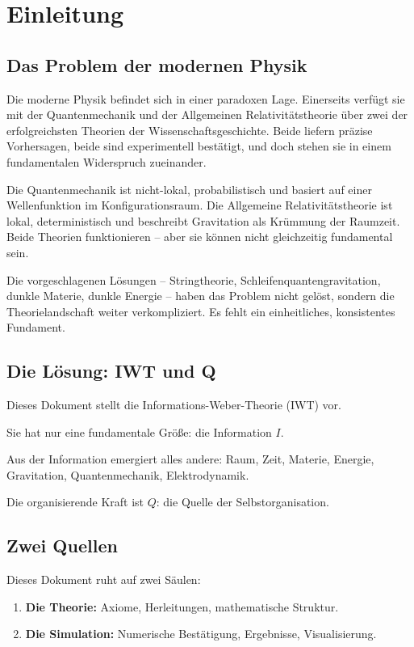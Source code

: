 \chapter{Einleitung}

\section{Das Problem der modernen Physik}

Die moderne Physik befindet sich in einer paradoxen Lage. Einerseits verfügt sie mit der Quantenmechanik und der Allgemeinen Relativitätstheorie über zwei der erfolgreichsten Theorien der Wissenschaftsgeschichte. Beide liefern präzise Vorhersagen, beide sind experimentell bestätigt, und doch stehen sie in einem fundamentalen Widerspruch zueinander.

Die Quantenmechanik ist nicht-lokal, probabilistisch und basiert auf einer Wellenfunktion im Konfigurationsraum. Die Allgemeine Relativitätstheorie ist lokal, deterministisch und beschreibt Gravitation als Krümmung der Raumzeit. Beide Theorien funktionieren – aber sie können nicht gleichzeitig fundamental sein.

Die vorgeschlagenen Lösungen – Stringtheorie, Schleifenquantengravitation, dunkle Materie, dunkle Energie – haben das Problem nicht gelöst, sondern die Theorielandschaft weiter verkompliziert. Es fehlt ein einheitliches, konsistentes Fundament.

\section{Die Lösung: IWT und Q}

Dieses Dokument stellt die Informations-Weber-Theorie (IWT) vor.

Sie hat nur eine fundamentale Größe: die Information \( I \).

Aus der Information emergiert alles andere: Raum, Zeit, Materie, Energie, Gravitation, Quantenmechanik, Elektrodynamik.

Die organisierende Kraft ist \( Q \): die Quelle der Selbstorganisation.

\section{Zwei Quellen}

Dieses Dokument ruht auf zwei Säulen:

\begin{enumerate}
\item \textbf{Die Theorie:} Axiome, Herleitungen, mathematische Struktur.
\item \textbf{Die Simulation:} Numerische Bestätigung, Ergebnisse, Visualisierung.
\end{enumerate}

